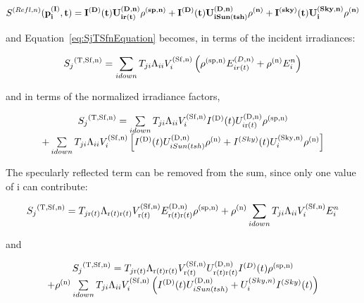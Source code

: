 \begin{equation}
S^{(Refl,n)}(\bf{p}_i^{(I)},t) = 
  I^{(D)}(t) U_{i r(t)}^{(D,n)} \rho^{(sp,n)} +
  I^{(D)}(t) U_{i Sun(tsh)}^{(D,n)} \rho^{(n)} +
  I^{(sky)}(t) U_i^{(Sky,n)} \rho^{(n)}
\end{equation}

and Equation~\ref{eq:SjTSfnEquation} becomes, in terms of the incident irradiances:

\begin{equation}
{S_j}^{{\rm{(T, Sf, n)}}} = \sum\limits_{i{\rm{ }}down} {{T_{ji}}{\Lambda_{ii}}V_i^{{\rm{(Sf, n)}}}\left( {{\rho ^{{\rm{(sp, n)}}}}E_{i{\rm{ }}r(t)}^{(D,n)} + {\rho ^{{\rm{(n)}}}}E_i^n} \right)}
\end{equation}

and in terms of the normalized irradiance factors,

\begin{equation}
\begin{array}{c}{S_j}^{{\rm{(T, Sf, n)}}} = \sum\limits_{i{\rm{ }}down} {{T_{ji}}{\Lambda_{ii}}V_i^{{\rm{(Sf, n)}}}{I^{{\rm{(D)}}}}(t)U_{i{\rm{ r(}}t{\rm{)}}}^{{\rm{(D,n)}}}{\rho ^{{\rm{(sp, n)}}}}} \\ + \sum\limits_{i{\rm{ }}down} {{T_{ji}}{\Lambda_{ii}}V_i^{{\rm{(Sf, n)}}}\left[ {{I^{{\rm{(D)}}}}(t)U_{i{\rm{ }}Sun(tsh)}^{{\rm{(D,n)}}}{\rho ^{{\rm{(n)}}}} + {I^{(Sky)}}(t)U_i^{{\rm{(Sky,n)}}}{\rho ^{{\rm{(n)}}}}} \right]} \end{array}
\label{eq:SjTSfnidownEquation}
\end{equation}

The specularly reflected term can be removed from the sum, since only one value of i can contribute:

\begin{equation}
{S_j}^{{\rm{(T, Sf, n)}}} = {T_{j{\rm{ r(}}t{\rm{)}}}}{\Lambda_{{\rm{ r(}}t{\rm{) r(}}t{\rm{)}}}}V_{{\rm{ r(}}t{\rm{)}}}^{{\rm{(Sf, n)}}}E_{{\rm{ r(}}t{\rm{) r(}}t{\rm{)}}}^{{\rm{(D,n)}}}{\rho ^{{\rm{(sp, n)}}}} + {\rho ^{{\rm{(n)}}}}\sum\limits_{i{\rm{ }}down} {{T_{ji}}{\Lambda_{ii}}V_i^{{\rm{(Sf, n)}}}E_i^n}
\end{equation}

and

\begin{equation}
\begin{array}{c}{S_j}^{{\rm{(T, Sf, n)}}} = {T_{j{\rm{ r(}}t{\rm{)}}}}{\Lambda_{{\rm{ r(}}t{\rm{) r(}}t{\rm{)}}}}V_{{\rm{ r(}}t{\rm{)}}}^{{\rm{(Sf, n)}}}U_{{\rm{ r(}}t{\rm{) r(}}t{\rm{)}}}^{{\rm{(D,n)}}}{I^{(D)}}(t){\rho ^{{\rm{(sp, n)}}}}\\ + {\rho ^{{\rm{(n)}}}}\sum\limits_{i{\rm{ }}down} {{T_{ji}}{\Lambda_{ii}}V_i^{{\rm{(Sf, n)}}}\left( {{I^{{\rm{(D)}}}}(t)U_{i{\rm{ }}Sun(tsh)}^{{\rm{(D,n)}}} + U_i^{(Sky,n)}{I^{(Sky)}}(t)} \right)} \end{array}
\end{equation}

